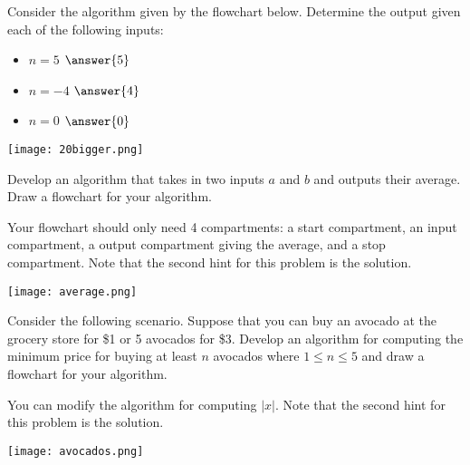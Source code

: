 \documentclass{ximera}
\begin{document}
\begin{question}
	Consider the algorithm given by the flowchart below. Determine the output given each of the following inputs:
	\begin{itemize}
		\item $n = 5$ $ \answer{5}$
		\item $n = -4$ $ \answer{4}$
		\item $n = 0$ $\answer{0}$
	\end{itemize}
	\begin{center}
	\texttt{[image: 20bigger.png]}
	\end{center}
\end{question}

\begin{question} 
	Develop an algorithm that takes in two inputs $a$ and $b$ and outputs their average. Draw a flowchart for your algorithm.
	\begin{hint}
		Your flowchart should only need 4 compartments: a start compartment, an input compartment, a output compartment giving the average, and a stop compartment. Note that the second hint for this problem is the solution.
	\end{hint}
	\begin{hint}
		\begin{center}
		\texttt{[image: average.png]}
		\end{center}
	\end{hint}
\end{question}
	
\begin{question}
	Consider the following scenario. Suppose that you can buy an avocado at the grocery store for \$1 or 5 avocados for \$3. Develop an algorithm for computing the minimum price for buying at least $n$ avocados where $1\leq n\leq 5$ and draw a flowchart for your algorithm.
	\begin{hint}
		You can modify the algorithm for computing $|x|$. Note that the second hint for this problem is the solution.
	\end{hint}
	\begin{hint}
		\begin{center}
		\texttt{[image: avocados.png]}
		\end{center}
	\end{hint}
\end{question}
\end{document}
